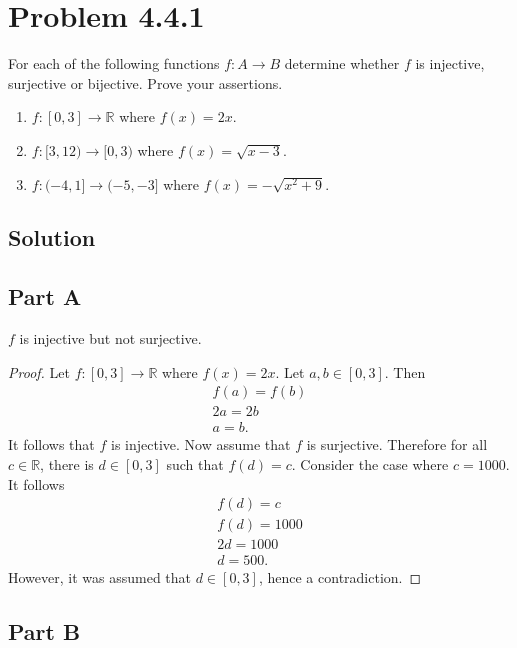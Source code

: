 \documentclass[12pt]{extarticle}
\begin{document}
\section*{Problem 4.4.1}

For each of the following functions $f : A \rightarrow B$ determine whether $f$ is injective, surjective or bijective. Prove your assertions.

\begin{enumerate}[label=(\alph*)]
	\item $f : [0,3] \rightarrow \mathbb{R}$ where $f(x)=2x$.
	\item $f : [3,12) \rightarrow [0,3)$ where $f(x)= \sqrt{x-3}$.
	\item $f : (-4,1] \rightarrow (-5,-3]$ where $f(x)=-\sqrt{x^2 + 9}$.
\end{enumerate}

\subsection*{Solution}
\subsection*{Part A}

$f$ is injective but not surjective.
\begin{proof}
	Let $f : [0,3] \rightarrow \mathbb{R}$ where $f(x)=2x$. Let $a,b \in [0,3]$. Then
	\begin{align*}
		f(a) = f(b) \\
		2a = 2b \\
		a = b
	.\end{align*}
	It follows that $f$ is injective. Now assume that $f$ is surjective. Therefore for all $c \in \mathbb{R}$, there is $d \in [0,3]$ such that $f(d) = c$. Consider the case where $c=1000$. It follows
	\begin{align*}
		f(d) = c \\
		f(d) = 1000 \\
		2d = 1000 \\
		d = 500
	.\end{align*}
	However, it was assumed that $d \in [0,3]$, hence a contradiction.
\end{proof}


\subsection*{Part B}
\end{document}
